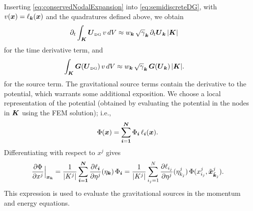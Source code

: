 \documentclass[10pt,preprint]{aastex}
\begin{document}
Inserting \eqref{eq:conservedNodalExpansion} into \eqref{eq:semidiscreteDG}, with $v(\boldsymbol{x})=\ell_{\boldsymbol{k}}(\boldsymbol{x})$ and the quadratures defined above, we obtain
\begin{align}
  \partial_{t}{}\int_{\boldsymbol{K}}\boldsymbol{U}_{\mbox{\tiny DG}}\,v\,dV
  &\approx w_{\boldsymbol{k}}\,\sqrt{\gamma}_{\boldsymbol{k}}\,\partial_{t}{}\boldsymbol{U}_{\boldsymbol{k}}\,|\boldsymbol{K}|
\end{align}
for the time derivative term, and
\begin{align}
  \int_{\boldsymbol{K}}\boldsymbol{G}(\boldsymbol{U}_{\mbox{\tiny DG}})\,v\,dV
  &\approx w_{\boldsymbol{k}}\,\sqrt{\gamma}_{\boldsymbol{k}}\,\boldsymbol{G}(\boldsymbol{U}_{\boldsymbol{k}})\,|\boldsymbol{K}|.
\end{align}
for the source term.  
The gravitational source terms contain the derivative to the potential, which warrants some additional exposition.  
We choose a local representation of the potential (obtained by evaluating the potential in the nodes in $\boldsymbol{K}$ using the FEM solution); i.e.,
\begin{equation}
  \Phi(\boldsymbol{x})=\sum_{\boldsymbol{i}=\boldsymbol{1}}^{\boldsymbol{N}}\Phi_{\boldsymbol{i}}\,\ell_{\boldsymbol{i}}(\boldsymbol{x}).  
\end{equation}
Differentiating with respect to $x^{j}$ gives
\begin{equation}
  \frac{\partial \Phi}{\partial x^{j}}\Big|_{\boldsymbol{x}_{\boldsymbol{k}}}
  =\frac{1}{|K^{j}|}\sum_{\boldsymbol{i}=\boldsymbol{1}}^{\boldsymbol{N}}\frac{\partial \ell_{\boldsymbol{i}}}{\partial \eta^{j}}(\eta_{\boldsymbol{k}})\,\Phi_{\boldsymbol{i}}
  =\frac{1}{|K^{j}|}\sum_{i_{j}=1}^{N}\frac{\partial \ell_{i_{j}}}{\partial \eta^{j}}(\eta_{k_{j}}^{j})\,\Phi(x_{i_{j}}^{j},\tilde{\boldsymbol{x}}_{\tilde{\boldsymbol{k}}_{j}}^{j}).  
\end{equation}
This expression is used to evaluate the gravitational sources in the momentum and energy equations.  
\end{document}
